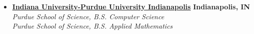 %
\begin{itemize}
    \parskip=0.1em

    \item
    \headerrow
        {\textbf{\href{https://www.iupui.edu/}{Indiana University-Purdue University Indianapolis}}}
        {\textbf{Indianapolis, IN}}
    \\
        {\emph{Purdue School of Science, B.S. Computer Science}}
        \\
        {\emph{Purdue School of Science, B.S. Applied Mathematics}}
\end{itemize}
